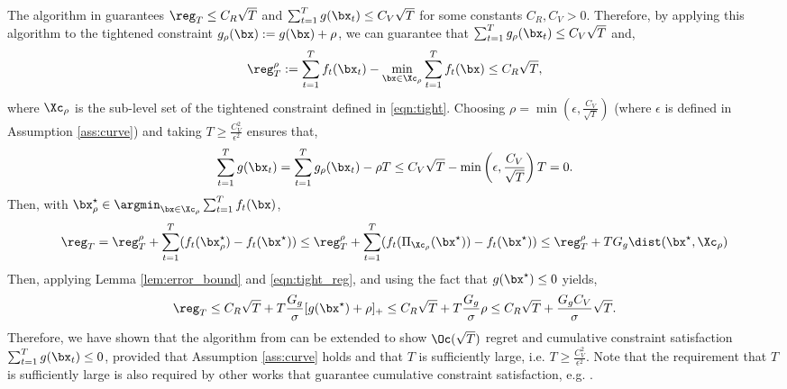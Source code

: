 The algorithm in \citet{yu2017online} guarantees $\reg_T \leq C_R \sqrt{T}$ and $\sum_{t=1}^{T} g(\bx_t) \leq C_V \sqrt{T}$ for some constants $C_R, C_V > 0$.
Therefore, by applying this algorithm to the tightened constraint $g_\rho (\bx) := g(\bx) + \rho$, we can guarantee that $\sum_{t=1}^{T} g_\rho (\bx_t) \leq C_V \sqrt{T}$ and,
\begin{equation}
    \label{eqn:tight_reg}
    \reg_T^\rho := \sum_{t=1}^{T} f_t(\bx_t) - \min_{\bx \in \Xc_\rho} \sum_{t=1}^{T} f_t(\bx) \leq C_R \sqrt{T},
\end{equation}
where $\Xc_\rho$ is the sub-level set of the tightened constraint defined in \eqref{eqn:tight}.
Choosing $\rho = \min\left( \epsilon, \frac{C_V}{\sqrt{T}} \right)$ (where $\epsilon$ is defined in Assumption \ref{ass:curve}) and taking $T \geq \frac{C_V^2}{\epsilon^2}$ ensures that,
\begin{equation}
    \label{eqn:tightening}
    \sum_{t=1}^{T} g (\bx_t)  = \sum_{t=1}^{T} g_\rho (\bx_t) - \rho T \leq C_V \sqrt{T} - \min\left( \epsilon, \frac{C_V}{\sqrt{T}} \right) T = 0.
\end{equation}
Then, with $\bx_\rho^\star \in \argmin_{\bx \in \Xc_\rho} \sum_{t=1}^{T} f_t(\bx)$,
\begin{equation*}
    \reg_T = \reg_T^\rho + \sum_{t=1}^{T} (f_t(\bx_\rho^\star) - f_t(\bx^\star)) \leq \reg_T^\rho + \sum_{t=1}^{T} (f_t(\Pi_{\Xc_\rho}(\bx^\star)) - f_t(\bx^\star)) \leq \reg_T^\rho + T G_g \dist(\bx^\star, \Xc_\rho) 
\end{equation*}
Then, applying Lemma \ref{lem:error_bound} and \eqref{eqn:tight_reg}, and using the fact that $g(\bx^\star) \leq 0$ yields,
\begin{equation*}
    \reg_T \leq C_R \sqrt{T} + T \frac{G_g}{\sigma} [g(\bx^\star) + \rho]_+ \leq C_R \sqrt{T} + T \frac{G_g}{\sigma} \rho \leq C_R \sqrt{T} + \frac{G_g C_V}{\sigma} \sqrt{T}.
\end{equation*}
Therefore, we have shown that the algorithm from \citet{yu2017online} can be extended to show $\Oc(\sqrt{T})$ regret and cumulative constraint satisfaction $\sum_{t=1}^{T} g(\bx_t) \leq 0$, provided that Assumption \ref{ass:curve} holds and that $T$ is sufficiently large, i.e. $T \geq \frac{C_V^2}{\epsilon^2}$.
Note that the requirement that $T$ is sufficiently large is also required by other works that guarantee cumulative constraint satisfaction, e.g. \cite{mahdavi2012trading,jenatton2016adaptive}.

